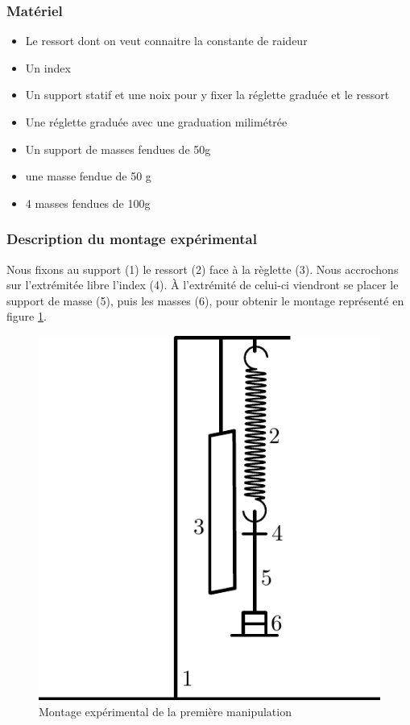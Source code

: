 \documentclass[a4paper,10pt,french]{scrartcl}
\begin{document}
\subsubsection{Matériel}
\begin{itemize}
 \item Le ressort dont on veut connaitre la constante de raideur
 \item Un index
 \item  Un support statif et une noix pour y fixer la réglette graduée et le ressort
 \item Une réglette graduée avec une graduation milimétrée
 \item Un support de masses fendues de 50g
 \item une masse fendue de 50 g
 \item 4 masses fendues de 100g
\end{itemize}

\subsubsection{Description du montage expérimental}
Nous fixons au support (1) le ressort (2) face à la règlette (3). Nous accrochons sur l'extrémitée libre l'index (4). À l'extrémité de celui-ci viendront se placer le support de masse (5), puis les masses (6), pour obtenir le montage représenté en figure \ref{fig1}.
\begin{figure}[H]
\begin{center}
 \includegraphics[scale=0.8]{path1}
 \end{center}
\caption{Montage expérimental de la première manipulation }
\label{fig1}
\end{figure}
\end{document}
